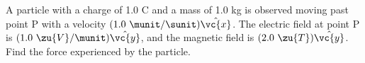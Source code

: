 A particle with a charge of 1.0 C and a mass of 1.0 kg is observed moving past point P
        with a velocity $(1.0\ \munit/\sunit)\hat{\vc{x}}$. The electric field at point P is
        $(1.0\ \zu{V}/\munit)\hat{\vc{y}}$, and the magnetic field is
        $(2.0\ \zu{T})\hat{\vc{y}}$. Find the force experienced by the particle.\answercheck
